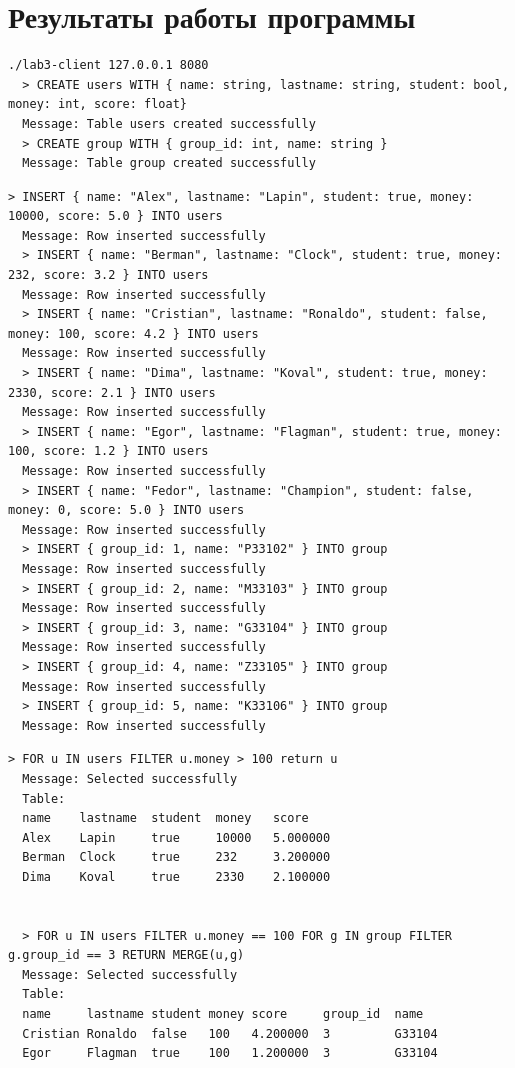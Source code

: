 \documentclass[12pt,onecolumn]{article}
\begin{document}
\section{Результаты работы программы}


\begin{lstlisting}[style=bash]
  ./lab3-client 127.0.0.1 8080
  > CREATE users WITH { name: string, lastname: string, student: bool, money: int, score: float}
  Message: Table users created successfully
  > CREATE group WITH { group_id: int, name: string }
  Message: Table group created successfully  
\end{lstlisting}

\begin{lstlisting}[style=bash]
  > INSERT { name: "Alex", lastname: "Lapin", student: true, money: 10000, score: 5.0 } INTO users
  Message: Row inserted successfully
  > INSERT { name: "Berman", lastname: "Clock", student: true, money: 232, score: 3.2 } INTO users
  Message: Row inserted successfully
  > INSERT { name: "Cristian", lastname: "Ronaldo", student: false, money: 100, score: 4.2 } INTO users
  Message: Row inserted successfully
  > INSERT { name: "Dima", lastname: "Koval", student: true, money: 2330, score: 2.1 } INTO users
  Message: Row inserted successfully
  > INSERT { name: "Egor", lastname: "Flagman", student: true, money: 100, score: 1.2 } INTO users
  Message: Row inserted successfully
  > INSERT { name: "Fedor", lastname: "Champion", student: false, money: 0, score: 5.0 } INTO users
  Message: Row inserted successfully
  > INSERT { group_id: 1, name: "P33102" } INTO group
  Message: Row inserted successfully
  > INSERT { group_id: 2, name: "M33103" } INTO group
  Message: Row inserted successfully
  > INSERT { group_id: 3, name: "G33104" } INTO group
  Message: Row inserted successfully
  > INSERT { group_id: 4, name: "Z33105" } INTO group
  Message: Row inserted successfully
  > INSERT { group_id: 5, name: "K33106" } INTO group
  Message: Row inserted successfully
\end{lstlisting}

\begin{lstlisting}[style=bash]
  > FOR u IN users FILTER u.money > 100 return u
  Message: Selected successfully
  Table:
  name    lastname  student  money   score          
  Alex    Lapin     true     10000   5.000000       
  Berman  Clock     true     232     3.200000       
  Dima    Koval     true     2330    2.100000


  > FOR u IN users FILTER u.money == 100 FOR g IN group FILTER g.group_id == 3 RETURN MERGE(u,g)
  Message: Selected successfully
  Table:
  name     lastname student money score     group_id  name           
  Cristian Ronaldo  false   100   4.200000  3         G33104         
  Egor     Flagman  true    100   1.200000  3         G33104

  
\end{lstlisting}
\end{document}
